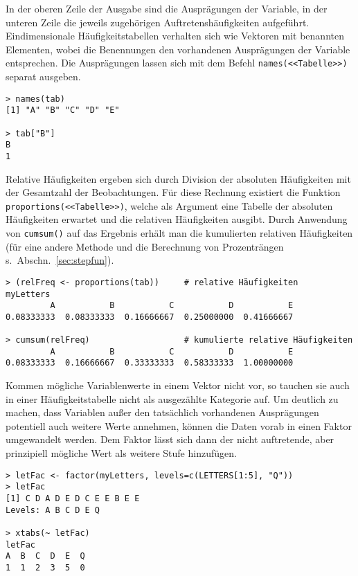 In der oberen Zeile der Ausgabe sind die Ausprägungen der Variable, in der unteren Zeile die jeweils zugehörigen Auftretenshäufigkeiten aufgeführt. Eindimensionale Häufigkeitstabellen verhalten sich wie Vektoren mit benannten Elementen, wobei die Benennungen den vorhandenen Ausprägungen der Variable entsprechen. Die Ausprägungen lassen sich mit dem Befehl \lstinline!names(<<Tabelle>>)! separat ausgeben.
\begin{lstlisting}
> names(tab)
[1] "A" "B" "C" "D" "E"

> tab["B"]
B
1
\end{lstlisting}

Relative Häufigkeiten ergeben sich durch Division der absoluten Häufigkeiten mit der Gesamtzahl der Beobachtungen. Für diese Rechnung existiert die Funktion \lstinline!proportions(<<Tabelle>>)!, welche als Argument eine Tabelle der absoluten Häufigkeiten erwartet und die relativen Häufigkeiten ausgibt. Durch Anwendung von \lstinline!cumsum()! auf das Ergebnis erhält man die kumulierten relativen Häufigkeiten (für eine andere Methode und die Berechnung von Prozenträngen s.\ Abschn.\ \ref{sec:stepfun}).
\begin{lstlisting}
> (relFreq <- proportions(tab))     # relative Häufigkeiten
myLetters
         A           B           C           D           E
0.08333333  0.08333333  0.16666667  0.25000000  0.41666667

> cumsum(relFreq)                   # kumulierte relative Häufigkeiten
         A           B           C           D           E
0.08333333  0.16666667  0.33333333  0.58333333  1.00000000
\end{lstlisting}

Kommen mögliche Variablenwerte in einem Vektor nicht vor, so tauchen sie auch in einer Häufigkeitstabelle nicht als ausgezählte Kategorie auf. Um deutlich zu machen, dass Variablen außer den tatsächlich vorhandenen Ausprägungen potentiell auch weitere Werte annehmen, können die Daten vorab in einen Faktor umgewandelt werden. Dem Faktor lässt sich dann der nicht auftretende, aber prinzipiell mögliche Wert als weitere Stufe hinzufügen.
\begin{lstlisting}
> letFac <- factor(myLetters, levels=c(LETTERS[1:5], "Q"))
> letFac
[1] C D A D E D C E E B E E
Levels: A B C D E Q

> xtabs(~ letFac)
letFac
A  B  C  D  E  Q
1  1  2  3  5  0
\end{lstlisting}

